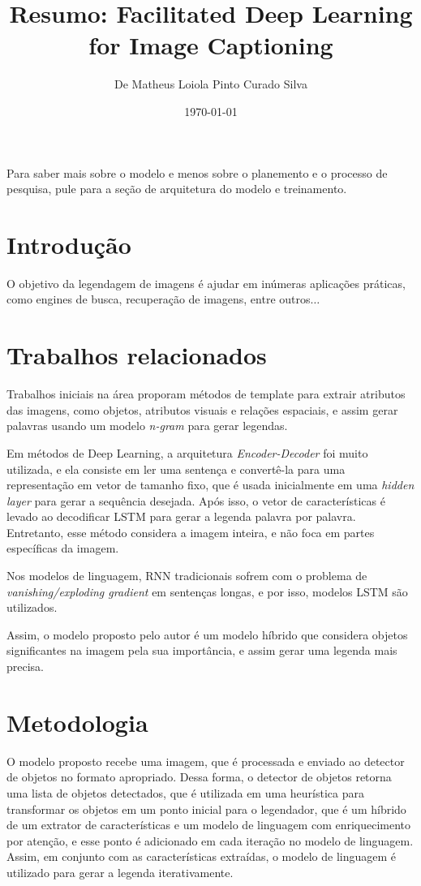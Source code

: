 \documentclass[12pt]{article}
\title{Resumo: Facilitated Deep Learning for Image Captioning}
\author{De Matheus Loiola Pinto Curado Silva}
\date{\today}
\begin{document}
\maketitle

Para saber mais sobre o modelo e menos sobre o planemento e o processo de pesquisa, pule para a seção de arquitetura do modelo e treinamento.

\section*{Introdução}

O objetivo da legendagem de imagens é ajudar em inúmeras aplicações práticas, como engines de busca, recuperação de imagens, entre outros$\ldots$

\section*{Trabalhos relacionados}

Trabalhos iniciais na área proporam métodos de template para extrair atributos das imagens, como objetos, atributos visuais e relações espaciais, e assim gerar palavras usando um modelo \textit{n-gram} para gerar legendas.

Em métodos de Deep Learning, a arquitetura \textit{Encoder-Decoder} foi muito utilizada, e ela consiste em ler uma sentença e convertê-la para uma representação em vetor de tamanho fixo, que é usada inicialmente em uma \textit{hidden layer} para gerar a sequência desejada. Após isso, o vetor de características é levado ao decodificar LSTM para gerar a legenda palavra por palavra. Entretanto, esse método considera a imagem inteira, e não foca em partes específicas da imagem.

Nos modelos de linguagem, RNN tradicionais sofrem com o problema de \textit{vanishing/exploding gradient} em sentenças longas, e por isso, modelos LSTM são utilizados. 

Assim, o modelo proposto pelo autor é um modelo híbrido que considera objetos significantes na imagem pela sua importância, e assim gerar uma legenda mais precisa.

\section*{Metodologia}

O modelo proposto recebe uma imagem, que é processada e enviado ao detector de objetos no formato apropriado. Dessa forma, o detector de objetos retorna uma lista de objetos detectados, que é utilizada em uma heurística para transformar os objetos em um ponto inicial para o legendador, que é um híbrido de um extrator de características e um modelo de linguagem com enriquecimento por atenção, e esse ponto é adicionado em cada iteração no modelo de linguagem. Assim, em conjunto com as características extraídas, o modelo de linguagem é utilizado para gerar a legenda iterativamente.
\end{document}
